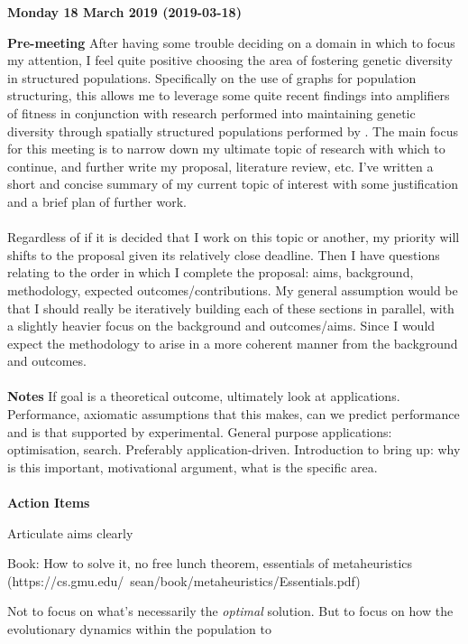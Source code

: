 \documentclass[10pt,a4paper]{article}
\newcommand{\cmark}{\ding{51}}%
\newcommand{\done}{\rlap{$\square$}{\raisebox{2pt}{\large\hspace{1pt}\cmark}}%
	\hspace{-2.5pt}}
\begin{document}
	\pagebreak
	\begin{center} \textbf{Monday 18 March 2019 (2019-03-18)} \end{center} 
	\textbf{Pre-meeting}
	After having some trouble deciding on a domain in which to focus my attention, I feel quite positive choosing the area of fostering genetic diversity in structured populations.
	Specifically on the use of graphs for population structuring, this allows me to leverage some quite recent findings into amplifiers of fitness \citep{graph-amplifiers} in conjunction with research performed into maintaining genetic diversity through spatially structured populations performed by \citep{distributed-evolutionary-art}.
	The main focus for this meeting is to narrow down my ultimate topic of research with which to continue, and further write my proposal, literature review, etc.
	I've written a short and concise summary of my current topic of interest with some justification and a brief plan of further work.
	\\\\
	Regardless of if it is decided that I work on this topic or another, my priority will shifts to the proposal given its relatively close deadline.
	Then I have questions relating to the order in which I complete the proposal: aims, background, methodology, expected outcomes/contributions.
	My general assumption would be that I should really be iteratively building each of these sections in parallel, with a slightly heavier focus on the background and outcomes/aims.
	Since I would expect the methodology to arise in a more coherent manner from the background and outcomes.
	\\\\
	\textbf{Notes}
	If goal is a theoretical outcome, ultimately look at applications. Performance, axiomatic assumptions that this makes, can we predict performance and is that supported by experimental.
	General purpose applications: optimisation, search.
	Preferably application-driven.
	Introduction to bring up: why is this important, motivational argument, what is the specific area.
	\\\\
	\textbf{Action Items}
	\begin{todolist}
		\item[\done] Articulate aims clearly
		\item Book: How to solve it, no free lunch theorem, essentials of metaheuristics (https://cs.gmu.edu/~sean/book/metaheuristics/Essentials.pdf)
		
		\item Not to focus on what's necessarily the \textit{optimal} solution. But to focus on how the evolutionary dynamics within the population to 
	\end{todolist}
	\pagebreak
	
\end{document}
